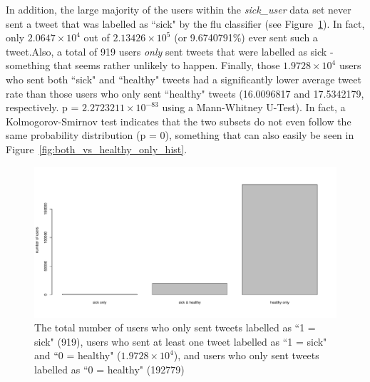 \documentclass[11pt, a4paper,twoside]{report}\usepackage[]{graphicx}\usepackage[]{color}
\begin{document}
In addition, the large majority of the users within the \textit{sick\_user} data set never sent a tweet that was labelled as ``sick" by the flu classifier (see Figure~\ref{fig:barplot_sick_df}). In fact, only \ensuremath{2.0647\times 10^{4}} out of \ensuremath{2.13426\times 10^{5}} (or 9.6740791\%) ever sent such a tweet.\newline Also, a total of 919 users \textit{only} sent tweets that were labelled as sick - something that seems rather unlikely to happen. Finally, those \ensuremath{1.9728\times 10^{4}} users who sent both ``sick" and ``healthy" tweets had a significantly lower average tweet rate than those users who only sent ``healthy" tweets (16.0096817 and 17.5342179, respectively. p = \ensuremath{2.2723211\times 10^{-83}} using a Mann-Whitney U-Test). In fact, a Kolmogorov-Smirnov test indicates that the two subsets do not even follow the same probability distribution (p = 0), something that can also easily be seen in Figure~\ref{fig:both_vs_healthy_only_hist}.

\begin{figure}[h]
\centering
\includegraphics[width=1\linewidth]{barplot_sick_raw_df.pdf}
\caption{The total number of users who only sent tweets labelled as ``1 = sick" (919), users who sent at least one tweet labelled as ``1 = sick" and ``0 = healthy" (\ensuremath{1.9728\times 10^{4}}), and users who only sent tweets labelled as ``0 = healthy" (192779)}
\label{fig:barplot_sick_df}
\end{figure}
\end{document}
